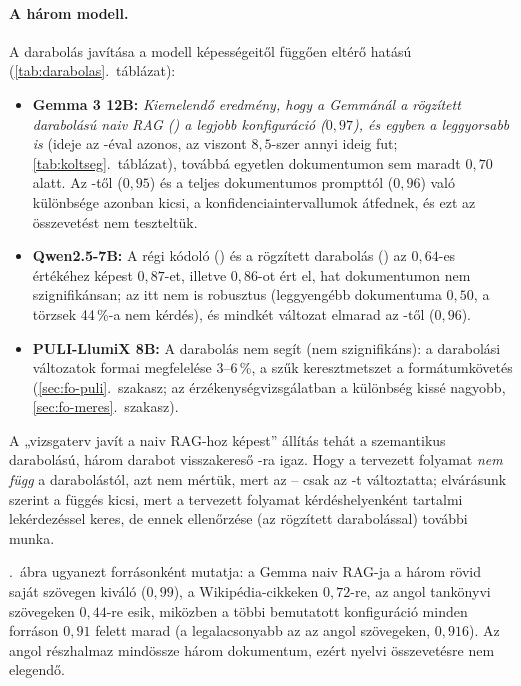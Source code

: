 \paragraph{A három modell.} A darabolás javítása a modell képességeitől függően eltérő hatású (\ref{tab:darabolas}.~táblázat):
\begin{itemize}[leftmargin=*,itemsep=2pt,topsep=2pt]
\item \textbf{Gemma 3 12B:} \emph{Kiemelendő eredmény, hogy a Gemmánál a rögzített darabolású naiv RAG () a legjobb konfiguráció ($0{,}97$), és egyben a leggyorsabb is} (ideje az -éval azonos, az  viszont $8{,}5$-szer annyi ideig fut; \ref{tab:koltseg}.~táblázat), továbbá egyetlen dokumentumon sem maradt $0{,}70$ alatt. Az -től ($0{,}95$) és a teljes dokumentumos prompttól ($0{,}96$) való különbsége azonban kicsi, a konfidenciaintervallumok átfednek, és ezt az összevetést nem teszteltük.
\item \textbf{Qwen2.5-7B:} A régi kódoló () és a rögzített darabolás () az  $0{,}64$-es értékéhez képest $0{,}87$-et, illetve $0{,}86$-ot ért el, hat dokumentumon nem szignifikánsan; az  itt nem is robusztus (leggyengébb dokumentuma $0{,}50$, a törzsek 44\,\%-a nem kérdés), és mindkét változat elmarad az -től ($0{,}96$).
\item \textbf{PULI-LlumiX 8B:} A darabolás nem segít (nem szignifikáns): a darabolási változatok formai megfelelése 3--6\,\%, a szűk keresztmetszet a formátumkövetés (\ref{sec:fo-puli}.~szakasz; az érzékenységvizsgálatban a különbség kissé nagyobb, \ref{sec:fo-meres}.~szakasz).
\end{itemize}

A „vizsgaterv javít a naiv RAG-hoz képest” állítás tehát a szemantikus darabolású, három darabot visszakereső
-ra igaz. Hogy a tervezett folyamat \emph{nem függ} a darabolástól, azt nem mértük, mert az
-- csak az -t változtatta; elvárásunk szerint a függés kicsi, mert a tervezett
folyamat kérdéshelyenként tartalmi lekérdezéssel keres, de ennek ellenőrzése (az  rögzített
darabolással) további munka.

\Az{\ref{fig:forrasok}}.~ábra ugyanezt forrásonként mutatja: a Gemma naiv RAG-ja a három rövid saját szövegen
kiváló ($0{,}99$), a Wikipédia-cikkeken $0{,}72$-re, az angol tankönyvi szövegeken $0{,}44$-re esik, miközben a
többi bemutatott konfiguráció minden forráson $0{,}91$ felett marad (a legalacsonyabb az  az angol
szövegeken, $0{,}916$). Az angol részhalmaz mindössze három dokumentum, ezért nyelvi összevetésre nem elegendő.

